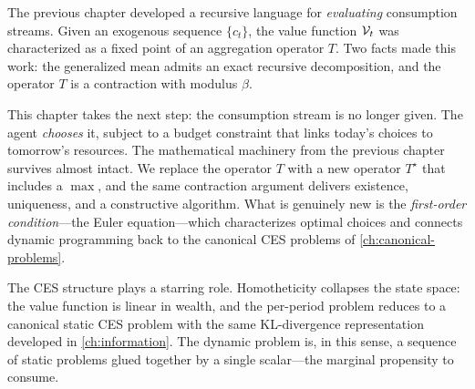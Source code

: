 
\label{ch:dynamic-programming}

The previous chapter developed a recursive language for \emph{evaluating} consumption streams. Given an exogenous sequence $\{c_t\}$, the value function $\mathcal{V}_t$ was characterized as a fixed point of an aggregation operator $T$. Two facts made this work: the generalized mean admits an exact recursive decomposition, and the operator $T$ is a contraction with modulus $\beta$.

This chapter takes the next step: the consumption stream is no longer given. The agent \emph{chooses} it, subject to a budget constraint that links today's choices to tomorrow's resources. The mathematical machinery from the previous chapter survives almost intact. We replace the operator $T$ with a new operator $T^\star$ that includes a $\max$, and the same contraction argument delivers existence, uniqueness, and a constructive algorithm. What is genuinely new is the \emph{first-order condition}---the Euler equation---which characterizes optimal choices and connects dynamic programming back to the canonical CES problems of \cref{ch:canonical-problems}.

The CES structure plays a starring role. Homotheticity collapses the state space: the value function is linear in wealth, and the per-period problem reduces to a canonical static CES problem with the same KL-divergence representation developed in \cref{ch:information}. The dynamic problem is, in this sense, a sequence of static problems glued together by a single scalar---the marginal propensity to consume.











